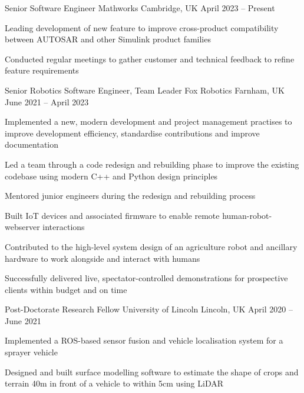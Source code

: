 \documentclass[11pt,a4paper]{awesome-cv}        %
\begin{document}
\makecvheader



\begin{cventries}
  \cventry
  {Senior Software Engineer}
  {Mathworks}
  {Cambridge, UK}
  {April 2023 -- Present}
  {
    \begin{cvitems}
      \item Leading development of new feature to improve cross-product compatibility between AUTOSAR and other Simulink product families
      \item Conducted regular meetings to gather customer and technical feedback to refine feature requirements
    \end{cvitems}
  }
  \cventry
  {Senior Robotics Software Engineer, Team Leader}
  {Fox Robotics}
  {Farnham, UK}
  {June 2021 -- April 2023}
  {
    \begin{cvitems}
      \item Implemented a new, modern development and project management practises to improve development efficiency, standardise contributions and improve documentation
      \item Led a team through a code redesign and rebuilding phase to improve the existing codebase using modern C++ and Python design principles
      \item Mentored junior engineers during the redesign and rebuilding process
      \item Built IoT devices and associated firmware to enable remote human-robot-webserver interactions
      \item Contributed to the high-level system design of an agriculture robot and ancillary hardware to work alongside and interact with humans
      \item Successfully delivered live, spectator-controlled demonstrations for prospective clients within budget and on time
    \end{cvitems}
  }
  \cventry
  {Post-Doctorate Research Fellow}
  {University of Lincoln}
  {Lincoln, UK}
  {April 2020 -- June 2021}
  {
    \begin{cvitems}
      \item Implemented a ROS-based sensor fusion and vehicle localisation system for a sprayer vehicle
      \item Designed and built surface modelling software to estimate the shape of crops and terrain 40m in front of a vehicle to within 5cm using LiDAR

\end{cvitems}}
\end{cventries}
\end{document}
